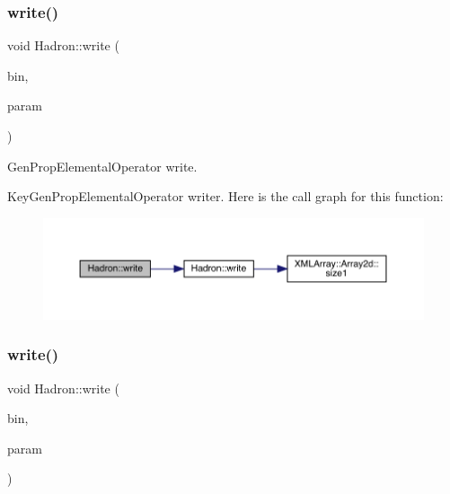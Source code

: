 \subsubsection{\texorpdfstring{write()}{write()}\hspace{0.1cm}{\footnotesize\ttfamily [61/95]}}
{\footnotesize\ttfamily void Hadron\+::write (\begin{DoxyParamCaption}\item[{\mbox{\hyperlink{classADATIO_1_1BinaryWriter}{Binary\+Writer}} \&}]{bin,  }\item[{const \mbox{\hyperlink{structHadron_1_1KeyGenPropElementalOperator__t}{Key\+Gen\+Prop\+Elemental\+Operator\+\_\+t}} \&}]{param }\end{DoxyParamCaption})}



Gen\+Prop\+Elemental\+Operator write. 

Key\+Gen\+Prop\+Elemental\+Operator writer. Here is the call graph for this function\+:
\nopagebreak
\begin{figure}[H]
\begin{center}
\leavevmode
\includegraphics[width=350pt]{d1/daf/namespaceHadron_af1d6496318c689e52be27a9f842ccc2d_cgraph}
\end{center}
\end{figure}
\mbox{\label{namespaceHadron_a97d7de65e3fea244c875c2cb76decfda}} 
\subsubsection{\texorpdfstring{write()}{write()}\hspace{0.1cm}{\footnotesize\ttfamily [62/95]}}
{\footnotesize\ttfamily void Hadron\+::write (\begin{DoxyParamCaption}\item[{\mbox{\hyperlink{classADATIO_1_1BinaryWriter}{Binary\+Writer}} \&}]{bin,  }\item[{const \mbox{\hyperlink{structHadron_1_1HadronAdjMapTarget__t}{Hadron\+Adj\+Map\+Target\+\_\+t}} \&}]{param }\end{DoxyParamCaption})}

